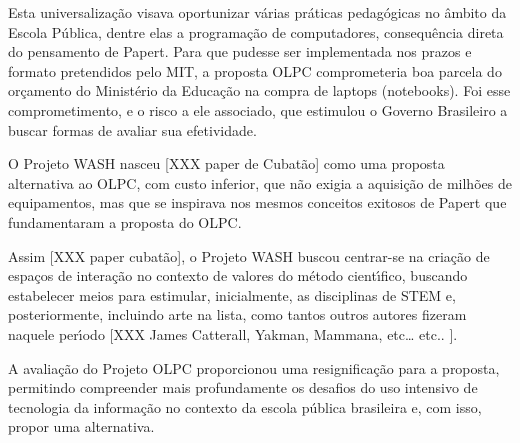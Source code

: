\documentclass[
12pt,		%
openright,	%
twoside,  %
a4paper,			%
chapter=TITLE,		%
english,			%
french,				%
spanish,			%
brazil				%
]{USPSC-classe/USPSC}
\begin{document}
Esta universaliza\c{c}\~ao visava oportunizar v\'arias pr\'aticas pedag\'ogicas no \^ambito da Escola P\'ublica, dentre elas a programa\c{c}\~ao de computadores, consequ\^encia direta do pensamento de Papert. Para que pudesse ser implementada nos prazos e formato pretendidos pelo MIT, a proposta OLPC comprometeria boa parcela do or\c{c}amento do Minist\'erio da Educa\c{c}\~ao na compra de laptops (notebooks). Foi esse comprometimento, e o risco a ele associado, que estimulou o Governo Brasileiro a buscar formas de avaliar sua efetividade.














O Projeto WASH nasceu [XXX paper de Cubat\~ao] como uma proposta alternativa ao OLPC, com custo inferior, que n\~ao exigia a aquisi\c{c}\~ao de milh\~oes de equipamentos, mas que se inspirava nos mesmos conceitos exitosos de Papert que fundamentaram a proposta do OLPC.














Assim [XXX paper cubat\~ao], o Projeto WASH buscou centrar-se na cria\c{c}\~ao de espa\c{c}os de intera\c{c}\~ao no contexto de valores do m\'etodo cient\'{\i}fico, buscando estabelecer meios para estimular, inicialmente, as disciplinas de STEM e, posteriormente, incluindo arte na lista, como tantos outros autores fizeram naquele per\'{\i}odo [XXX James Catterall, Yakman, Mammana, etc… etc.. ].














A avalia\c{c}\~ao do Projeto OLPC proporcionou uma resignifica\c{c}\~ao para a proposta, permitindo compreender mais profundamente os desafios do uso intensivo de tecnologia da informa\c{c}\~ao no contexto da escola p\'ublica brasileira e, com isso, propor uma alternativa.
\end{document}
